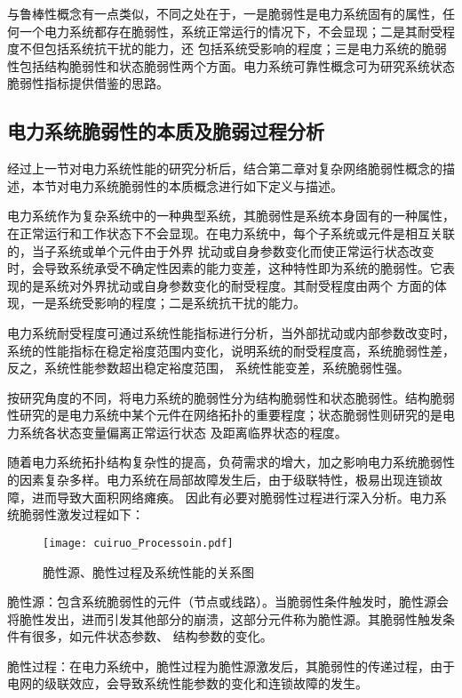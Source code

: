 与鲁棒性概念有一点类似，不同之处在于，一是脆弱性是电力系统固有的属性，任何一个电力系统都存在脆弱性，系统正常运行的情况下，不会显现；二是其耐受程度不但包括系统抗干扰的能力，还
包括系统受影响的程度；三是电力系统的脆弱性包括结构脆弱性和状态脆弱性两个方面。电力系统可靠性概念可为研究系统状态脆弱性指标提供借鉴的思路。


\subsection{电力系统脆弱性的本质及脆弱过程分析}
\label{sec:network}

经过上一节对电力系统性能的研究分析后，结合第二章对复杂网络脆弱性概念的描述，本节对电力系统脆弱性的本质概念进行如下定义与描述。

电力系统作为复杂系统中的一种典型系统，其脆弱性是系统本身固有的一种属性，在正常运行和工作状态下不会显现。在电力系统中，每个子系统或元件是相互关联的，当子系统或单个元件由于外界
扰动或自身参数变化而使正常运行状态改变时，会导致系统承受不确定性因素的能力变差，这种特性即为系统的脆弱性。它表现的是系统对外界扰动或自身参数变化的耐受程度。其耐受程度由两个
方面的体现，一是系统受影响的程度；二是系统抗干扰的能力。

电力系统耐受程度可通过系统性能指标进行分析，当外部扰动或内部参数改变时，系统的性能指标在稳定裕度范围内变化，说明系统的耐受程度高，系统脆弱性差，反之，系统性能参数超出稳定裕度范围，
系统性能变差，系统脆弱性强。

按研究角度的不同，将电力系统的脆弱性分为结构脆弱性和状态脆弱性。结构脆弱性研究的是电力系统中某个元件在网络拓扑的重要程度；状态脆弱性则研究的是电力系统各状态变量偏离正常运行状态
及距离临界状态的程度。

随着电力系统拓扑结构复杂性的提高，负荷需求的增大，加之影响电力系统脆弱性的因素复杂多样。电力系统在局部故障发生后，由于级联特性，极易出现连锁故障，进而导致大面积网络瘫痪。
因此有必要对脆弱性过程进行深入分析。电力系统脆弱性激发过程如下：
\begin{figure}[H] %
  \centering
  \texttt{[image: cuiruo\_Processoin.pdf]}
  \caption{脆性源、脆性过程及系统性能的关系图}
  \label{fig:procession}
\end{figure}

脆性源：包含系统脆弱性的元件（节点或线路）。当脆弱性条件触发时，脆性源会将脆性发出，进而引发其他部分的崩溃，这部分元件称为脆性源。其脆弱性触发条件有很多，如元件状态参数、
结构参数的变化。

脆性过程：在电力系统中，脆性过程为脆性源激发后，其脆弱性的传递过程，由于电网的级联效应，会导致系统性能参数的变化和连锁故障的发生。

